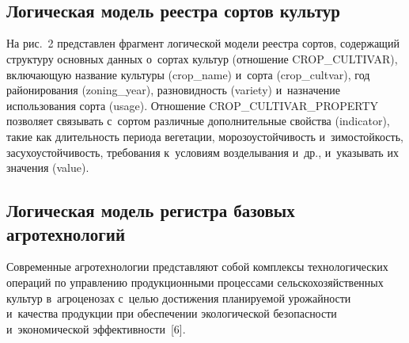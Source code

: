 \begin{multicols}{2}
\begin{figure*}[b] %
\vspace*{1pt}
\begin{center}
   \mbox{%
\epsfxsize=160mm
}
\end{center}
\vspace*{-9pt}
\vspace*{18pt}
\begin{center}
   \mbox{%
\epsfxsize=160mm
}
\end{center}
\vspace*{-9pt}
\end{figure*}



\subsection{Логическая модель реестра сортов культур}

    На рис.~2 представлен фрагмент логической модели реестра сортов, 
содержащий структуру основных данных о~сортах культур (отношение\linebreak 
CROP\_CULTIVAR), включающую название культуры (crop\_name) и~сорта 
(crop\_cultvar), год районирования (zoning\_year), разновидность (variety) 
и~назначение использования сорта (usage). \mbox{Отношение} 
CROP\_CULTIVAR\_PROPERTY позволяет связывать с~сортом различные 
дополнительные свойства (indicator), такие как длительность периода 
вегетации, морозоустойчивость и~зимостойкость, засухоустойчивость, 
требования к~условиям возделывания и~др., и~указывать их значения 
(value). 
    


\subsection{Логическая модель регистра базовых агротехнологий}

    Современные агротехнологии представляют собой комплексы 
технологических операций по управ\-ле\-нию продукционными процессами 
сельскохозяйственных культур в~агроценозах с~целью достижения 
планируемой урожайности и~качества продукции при обеспечении 
экологической безопасности и~экономической эффективности~[6].
    


\end{multicols}
